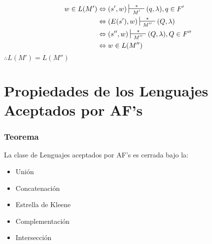 \begin{align*}
w \in L(M') & \Leftrightarrow (s',w) \sststile{M'}{\hspace{0.25cm} * \hspace{0.25cm}} (q,\lambda), q\in F' \\
& \Leftrightarrow	(E(s'),w) \sststile{M''}{\hspace{0.25cm} * \hspace{0.25cm}} (Q,\lambda)\\
& \Leftrightarrow (s'',w) \sststile{M''}{\hspace{0.25cm} * \hspace{0.25cm}} (Q,\lambda), Q\in F'' \\
& \Leftrightarrow  w\in L(M'')
\end{align*}
$\therefore L(M')=L(M'')$
\section{Propiedades de los Lenguajes Aceptados por AF's}
\subsubsection*{Teorema}
La clase de Lenguajes aceptados por AF's es cerrada bajo la:
\begin{itemize}
\item Unión
\item Concatenación
\item Estrella de Kleene
\item Complementación
\item Intersección
\end{itemize}
